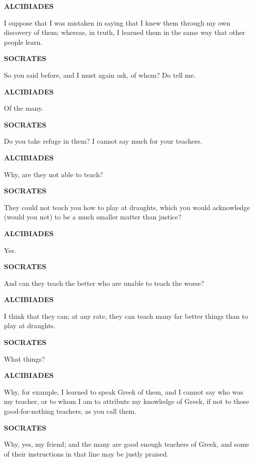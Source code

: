 \documentclass[11pt,letter]{article}
\begin{document}
\par \textbf{ALCIBIADES}
\par   I suppose that I was mistaken in saying that I knew them through my own discovery of them; whereas, in truth, I learned them in the same way that other people learn.

\par \textbf{SOCRATES}
\par   So you said before, and I must again ask, of whom? Do tell me.

\par \textbf{ALCIBIADES}
\par   Of the many.

\par \textbf{SOCRATES}
\par   Do you take refuge in them? I cannot say much for your teachers.

\par \textbf{ALCIBIADES}
\par   Why, are they not able to teach?

\par \textbf{SOCRATES}
\par   They could not teach you how to play at draughts, which you would acknowledge (would you not) to be a much smaller matter than justice?

\par \textbf{ALCIBIADES}
\par   Yes.

\par \textbf{SOCRATES}
\par   And can they teach the better who are unable to teach the worse?

\par \textbf{ALCIBIADES}
\par   I think that they can; at any rate, they can teach many far better things than to play at draughts.

\par \textbf{SOCRATES}
\par   What things?

\par \textbf{ALCIBIADES}
\par   Why, for example, I learned to speak Greek of them, and I cannot say who was my teacher, or to whom I am to attribute my knowledge of Greek, if not to those good-for-nothing teachers, as you call them.

\par \textbf{SOCRATES}
\par   Why, yes, my friend; and the many are good enough teachers of Greek, and some of their instructions in that line may be justly praised.
\end{document}
